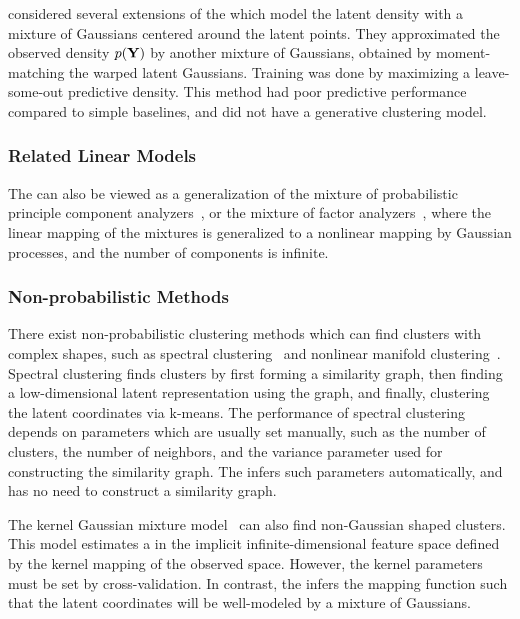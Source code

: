 \citet{nickisch2010gaussian} considered several extensions of the \gplvm{} which model the latent density with a mixture of Gaussians centered around the latent points.
They approximated the observed density $p(\mathbf{Y})$ by another mixture of Gaussians, obtained by moment-matching the warped latent Gaussians.
Training was done by maximizing a leave-some-out predictive density.
This method had poor predictive performance compared to simple baselines, and did not have a generative clustering model.


\subsubsection{Related Linear Models}
The \iwmm{} can also be viewed as a generalization of the mixture of probabilistic principle component analyzers~\citep{tipping1999mixtures}, or the mixture of factor analyzers~\citep{ghahramani2000variational}, where the linear mapping of the mixtures is generalized to a nonlinear mapping by Gaussian processes, and the number of components is infinite.


\subsubsection{Non-probabilistic Methods}
There exist non-probabilistic clustering methods which can find clusters with complex shapes, such as spectral clustering~\citep{ng2002spectral} and nonlinear manifold clustering~\citep{cao2006nonlinear,elhamifar2011sparse}.
Spectral clustering finds clusters by first forming a similarity graph, then finding a low-dimensional latent representation using the graph, and finally, clustering the latent coordinates via k-means.
The performance of spectral clustering depends on parameters which are usually set manually, such as the number of clusters, the number of neighbors, and the variance parameter used for constructing the similarity graph.
The \iwmm{} infers such parameters automatically, and has no need to construct a similarity graph.

The kernel Gaussian mixture model~\citep{wang2003kernel} can also find non-Gaussian shaped clusters.
This model estimates a \GMM{} in the implicit infinite-dimensional feature space defined by the kernel mapping of the observed space.
However, the kernel parameters must be set by cross-validation.
In contrast, the \iwmm{} infers the mapping function such that the latent coordinates will be well-modeled by a mixture of Gaussians.

